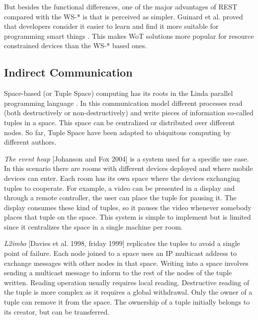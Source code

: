 But besides the functional differences, one of the major advantages of REST compared with the WS-* is that is perceived as simpler.
Guinard et al. proved that developers consider it easier to learn and find it more suitable for programming smart things \cite{}.
This makes WoT solutions more popular for resource constrained devices than the WS-* based ones.






\subsection{Indirect Communication}
\label{sec:indirect_communication}


Space-based (or Tuple Space) computing has its roots in the Linda parallel programming language \cite{gelernter_generative_1985}.
In this communication model different processes read (both destructively or non-destructively) and write pieces of information so-called tuples in a space.
This space can be centralized or distributed over different nodes.
So far, Tuple Space have been adapted to ubiquitous computing by different authors.




\emph{The event heap} [Johanson and Fox 2004] is a system used for a specific use case. %
In this scenario there are rooms with different devices deployed and where mobile devices can enter.
Each room has its own space where the devices exchanging tuples to cooperate.
For example, a video can be presented in a display and through a remote controller, the user can place the tuple for pausing it.
The display consumes these kind of tuples, so it pauses the video whenever somebody places that tuple on the space.
This system is simple to implement but is limited since it centralizes the space in a single machine per room. %


\emph{L2imbo} [Davies et al. 1998, friday 1999] replicates the tuples to avoid a single point of failure. %
Each node joined to a space uses an IP multicast address to exchange messages with other nodes in that space.
Writing into a space involves sending a multicast message to inform to the rest of the nodes of the tuple written.
Reading operation usually requires local reading.
Destructive reading of the tuple is more complex as it requires a global withdrawal.
Only the owner of a tuple can remove it from the space.
The ownership of a tuple initially belongs to its creator, but can be transferred. %


